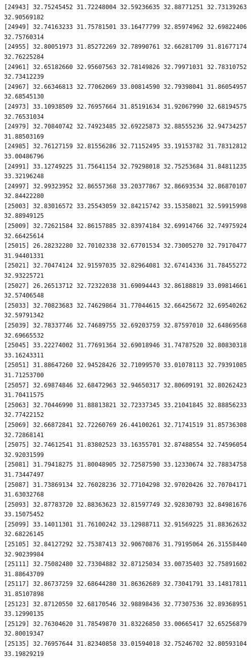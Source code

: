 \documentclass[
  letterpaper,
  DIV=11,
  numbers=noendperiod]{scrartcl}
\begin{document}
\begin{verbatim}
[24943] 32.75245452 31.72248004 32.59236635 32.88771251 32.73139263 32.90569182
[24949] 32.74163233 31.75781501 33.16477799 32.85974962 32.69822406 32.75760314
[24955] 32.80051973 31.85272269 32.78990761 32.66281709 31.81677174 32.76225284
[24961] 32.65182660 32.95607563 32.78149826 32.79971031 32.78310752 32.73412239
[24967] 32.66346813 32.77062069 33.00814590 32.79398041 31.86054957 32.68545130
[24973] 33.10938509 32.76957664 31.85191634 31.92067990 32.68194575 32.76531034
[24979] 32.70840742 32.74923485 32.69225873 32.88555236 32.94734257 31.88503169
[24985] 32.76127159 32.81556286 32.71152495 33.19153782 31.78312812 33.00486796
[24991] 33.12749225 31.75641154 32.79298018 32.75253684 31.84811235 33.32196248
[24997] 32.99323952 32.86557368 33.20377867 32.86693534 32.86870107 32.84422280
[25003] 32.83016572 33.25543059 32.84215742 33.15358021 32.59915998 32.88949125
[25009] 32.72621584 32.86157885 32.83974184 32.69914766 32.74975924 32.66425614
[25015] 26.28232280 32.70102338 32.67701534 32.73005270 32.79170477 31.94401331
[25021] 32.70474124 32.91597035 32.82964081 32.67414336 31.78455272 32.93225721
[25027] 26.26513712 32.72322038 31.69094443 32.86188819 33.09814661 32.57406548
[25033] 32.70823683 32.74629864 31.77044615 32.66425672 32.69540262 32.59791342
[25039] 32.78337746 32.74689755 32.69203759 32.87597010 32.64869568 32.69665532
[25045] 33.22274002 31.77691364 32.69018946 31.74787520 32.80830318 33.16243311
[25051] 31.88647260 32.94528426 32.71099570 33.01078113 32.79391085 31.71253700
[25057] 32.69874846 32.68472963 32.94650317 32.80609191 32.80262423 31.70411575
[25063] 32.70446990 31.88813821 32.72337345 33.21041845 32.88856233 32.77422152
[25069] 32.66872841 32.72260769 26.44100261 32.71741519 31.85736308 32.72868141
[25075] 32.74612541 31.83802523 33.16355701 32.87488554 32.74596054 32.92031599
[25081] 31.79418275 31.80048905 32.72587590 33.12330674 32.78834758 31.73447497
[25087] 31.73869134 32.76028236 32.77104298 32.97020426 32.70704171 31.63032768
[25093] 32.87783720 32.88363623 32.81597749 32.92830793 32.84981676 33.15075452
[25099] 33.14011301 31.76100242 33.12988711 32.91569225 31.88362632 32.68226145
[25105] 32.84127292 32.75387413 32.90670876 31.79195064 26.31558440 32.90239984
[25111] 32.75082480 32.73304882 32.87125034 33.00735403 32.75891602 31.88643709
[25117] 32.86737259 32.68644280 31.86362689 32.73041791 33.14817811 31.85107898
[25123] 32.87120550 32.68170546 32.98898436 32.77307536 32.89368951 33.12990135
[25129] 32.76304620 31.78549870 31.83226850 33.00665417 32.65256879 32.80019347
[25135] 32.76957644 31.82340858 33.01594018 32.75246702 32.80593104 33.19829219

\end{verbatim}
\end{document}
